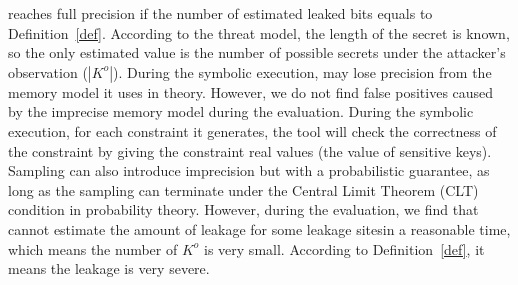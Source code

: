 \tool{} reaches full precision if the number of estimated leaked bits 
equals to Definition~\ref{def}. According to the threat model, the 
length of the secret is known, so the only estimated value is the number
 of possible secrets under the attacker's observation ($|K^o|$). 
 During the symbolic execution, \tool{} may lose precision from the 
 memory model it uses in theory. However, we do not find false positives 
 caused by the imprecise memory model during the evaluation. 
 During the symbolic execution, for each constraint it generates,
 the tool will check the correctness of the constraint by giving 
 the constraint real values (the value of sensitive keys). Sampling 
 can also introduce imprecision but with a probabilistic guarantee, 
 as long as the sampling can terminate under the Central Limit Theorem (CLT) condition in probability theory. 
 However, during the evaluation, we find that \tool{} cannot estimate 
 the amount of leakage for some leakage sitesin a reasonable time, 
 which means the number of $K^o$ is very small. According to Definition~\ref{def}, 
 it means the leakage is very severe.
